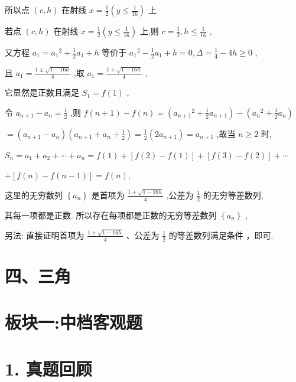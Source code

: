 \documentclass[10pt]{article}
\newcommand*\circled[1]{\tikz[baseline=(char.base)]{\node[shape=circle,draw,inner sep=1.5pt] (char) {\small #1};}}
\begin{document}
所以点 \(\left( {c,h}\right)\) 在射线 \(x = \frac{1}{2}\left( {y \leq  \frac{1}{16}}\right)\) 上

若点 \(\left( {c,h}\right)\) 在射线 \(x = \frac{1}{2}\left( {y \leq  \frac{1}{16}}\right)\) 上,则 \(c = \frac{1}{2},h \leq  \frac{1}{16}\) ,

又方程 \({a}_{1} = {a}_{1}{}^{2} + \frac{1}{2}{a}_{1} + h\) 等价于 \({a}_{1}{}^{2} - \frac{1}{2}{a}_{1} + h = 0,\Delta  = \frac{1}{4} - {4h} \geq  0\) ,

且 \({a}_{1} = \frac{1 \pm  \sqrt{1 - {16h}}}{4}\) ,取 \({a}_{1} = \frac{1 + \sqrt{1 - {16h}}}{4}\) ,

它显然是正数且满足 \({S}_{1} = f\left( 1\right)\) ,

令 \({a}_{n + 1} - {a}_{n} = \frac{1}{2}\) ,则 \(f\left( {n + 1}\right)  - f\left( n\right)  = \left( {{a}_{n + 1}{}^{2} + \frac{1}{2}{a}_{n + 1}}\right)  - \left( {{a}_{n}{}^{2} + \frac{1}{2}{a}_{n}}\right)\)

\(= \left( {{a}_{n + 1} - {a}_{n}}\right) \left( {{a}_{n + 1} + {a}_{n} + \frac{1}{2}}\right)  = \frac{1}{2}\left( {2{a}_{n + 1}}\right)  = {a}_{n + 1}\) ,故当 \(n \geq  2\) 时,

\({S}_{n} = {a}_{1} + {a}_{2} + \cdots  + {a}_{n} = f\left( 1\right)  + \left\lbrack  {f\left( 2\right)  - f\left( 1\right) }\right\rbrack   + \left\lbrack  {f\left( 3\right)  - f\left( 2\right) }\right\rbrack   + \cdots\)

\(+ \left\lbrack  {f\left( n\right)  - f\left( {n - 1}\right) }\right\rbrack   = f\left( n\right) ,\)

这里的无穷数列 \(\left\{  {a}_{n}\right\}\) 是首项为 \(\frac{1 + \sqrt{1 - {16h}}}{4}\) ,公差为 \(\frac{1}{2}\) 的无穷等差数列,

其每一项都是正数. 所以存在每项都是正数的无穷等差数列 \(\left\{  {a}_{n}\right\}\) ,

另法: 直接证明首项为 \(\frac{1 + \sqrt{1 - {16h}}}{4}\) 、公差为 \(\frac{1}{2}\) 的等差数列满足条件 \circled{2} ，即可.

\section*{四、三角}

\section*{板块一:中档客观题}

\section*{1. 真题回顾}
\end{document}
